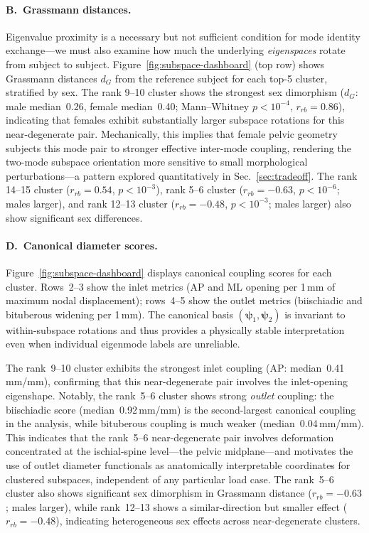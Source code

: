 \documentclass[11pt]{article}
\begin{document}
\paragraph{B.\ Grassmann distances.}
Eigenvalue proximity is a necessary but not sufficient condition for mode identity exchange---we must also examine how much the underlying \emph{eigenspaces} rotate from subject to subject.
Figure~\ref{fig:subspace-dashboard} (top row) shows Grassmann distances $d_G$ from the reference subject for each top-5 cluster, stratified by sex.
The rank 9--10 cluster shows the strongest sex dimorphism ($d_G$: male median~0.26, female median~0.40; Mann--Whitney $p < 10^{-4}$, $r_{rb} = 0.86$), indicating that females exhibit substantially larger subspace rotations for this near-degenerate pair.
Mechanically, this implies that female pelvic geometry subjects this mode pair to stronger effective inter-mode coupling, rendering the two-mode subspace orientation more sensitive to small morphological perturbations---a pattern explored quantitatively in Sec.~\ref{sec:tradeoff}.
The rank 14--15 cluster ($r_{rb} = 0.54$, $p < 10^{-3}$), rank 5--6 cluster ($r_{rb} = -0.63$, $p < 10^{-6}$; males larger), and rank 12--13 cluster ($r_{rb} = -0.48$, $p < 10^{-3}$; males larger) also show significant sex differences.

\paragraph{D.\ Canonical diameter scores.}
Figure~\ref{fig:subspace-dashboard} displays canonical coupling scores for each cluster.  Rows~2--3 show the inlet metrics (AP and ML opening per 1\,mm of maximum nodal displacement); rows~4--5 show the outlet metrics (biischiadic and bituberous widening per 1\,mm).
The canonical basis $(\boldsymbol\psi_1, \boldsymbol\psi_2)$ is invariant to within-subspace rotations and thus provides a physically stable interpretation even when individual eigenmode labels are unreliable.

The rank~9--10 cluster exhibits the strongest inlet coupling (AP: median~0.41\,mm/mm), confirming that this near-degenerate pair involves the inlet-opening eigenshape.
Notably, the rank~5--6 cluster shows strong \emph{outlet} coupling: the biischiadic score (median~0.92\,mm/mm) is the second-largest canonical coupling in the analysis, while bituberous coupling is much weaker (median~0.04\,mm/mm).
This indicates that the rank~5--6 near-degenerate pair involves deformation concentrated at the ischial-spine level---the pelvic midplane---and motivates the use of outlet diameter functionals as anatomically interpretable coordinates for clustered subspaces, independent of any particular load case.
The rank~5--6 cluster also shows significant sex dimorphism in Grassmann distance ($r_{rb} = -0.63$; males larger), while rank~12--13 shows a similar-direction but smaller effect ($r_{rb} = -0.48$), indicating heterogeneous sex effects across near-degenerate clusters.
\end{document}
